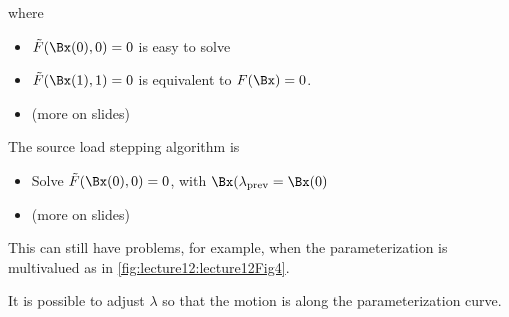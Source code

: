 where 

\begin{itemize}
\item \( \tilde{F}(\Bx(0), 0) = 0 \) is easy to solve
\item \( \tilde{F}(\Bx(1), 1) = 0 \) is equivalent to \( F(\Bx) = 0 \).
\item (more on slides)
\end{itemize}

The source load stepping algorithm is

\begin{itemize}
\item Solve \(\tilde{F}(\Bx(0), 0) = 0 \), with \( \Bx(\lambda_{\text{prev}} = \Bx(0) \)
\item (more on slides)
\end{itemize}

This can still have problems, for example, when the parameterization is multivalued as in \cref{fig:lecture12:lecture12Fig4}.


It is possible to adjust \( \lambda \) so that the motion is along the parameterization curve.

